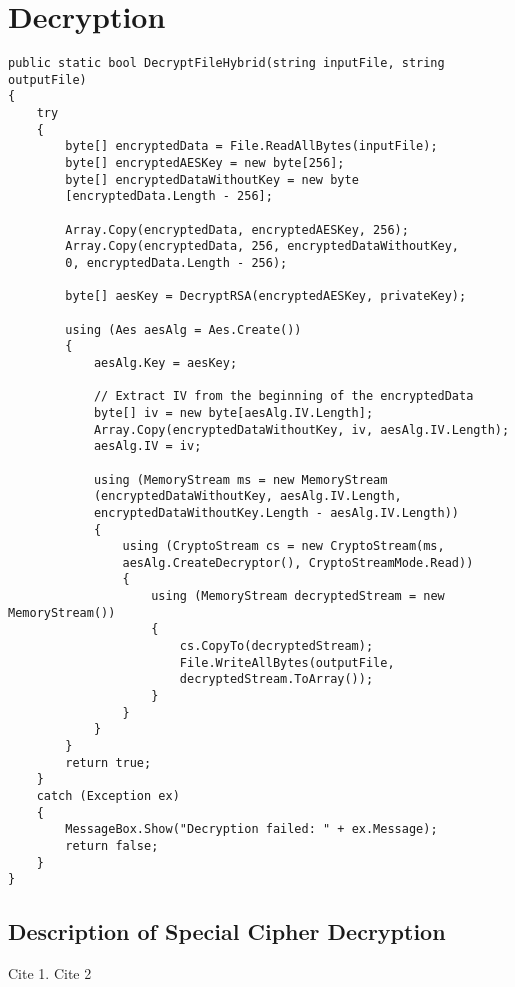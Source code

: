 \documentclass[a4paper,oneside,11pt]{book}
\begin{document}
\section{Decryption}
\begin{lstlisting}[language=Csh, caption={Code for Special Cipher Decryption}]
public static bool DecryptFileHybrid(string inputFile, string outputFile)
{
    try
    {
        byte[] encryptedData = File.ReadAllBytes(inputFile);
        byte[] encryptedAESKey = new byte[256];
        byte[] encryptedDataWithoutKey = new byte
        [encryptedData.Length - 256];
    
        Array.Copy(encryptedData, encryptedAESKey, 256);
        Array.Copy(encryptedData, 256, encryptedDataWithoutKey, 
        0, encryptedData.Length - 256);
    
        byte[] aesKey = DecryptRSA(encryptedAESKey, privateKey);
    
        using (Aes aesAlg = Aes.Create())
        {
            aesAlg.Key = aesKey;
    
            // Extract IV from the beginning of the encryptedData
            byte[] iv = new byte[aesAlg.IV.Length];
            Array.Copy(encryptedDataWithoutKey, iv, aesAlg.IV.Length);
            aesAlg.IV = iv;
    
            using (MemoryStream ms = new MemoryStream
            (encryptedDataWithoutKey, aesAlg.IV.Length, 
            encryptedDataWithoutKey.Length - aesAlg.IV.Length))
            {
                using (CryptoStream cs = new CryptoStream(ms, 
                aesAlg.CreateDecryptor(), CryptoStreamMode.Read))
                {
                    using (MemoryStream decryptedStream = new MemoryStream())
                    {
                        cs.CopyTo(decryptedStream);
                        File.WriteAllBytes(outputFile, 
                        decryptedStream.ToArray());
                    }
                }
            }
        }
        return true;
    }
    catch (Exception ex)
    {
        MessageBox.Show("Decryption failed: " + ex.Message);
        return false;
    }
}
\end{lstlisting}

\subsection{Description of Special Cipher Decryption}



Cite 1\citep{AUT2018}.\vspace{0.25cm}
\noindent Cite 2 \citep{AUT1999}



\end{document}
